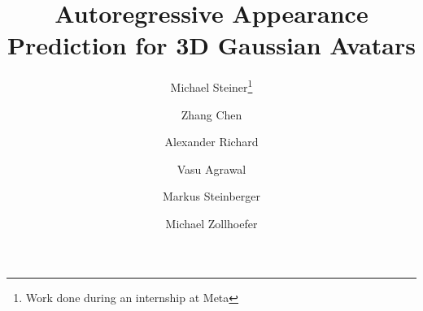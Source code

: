 \documentclass[runningheads]{llncs}
\begin{document}
\title{Autoregressive Appearance Prediction for 3D Gaussian Avatars} 



\author{Michael Steiner\thanks{Work done during an internship at Meta} \and
Zhang Chen \and
Alexander Richard \and
Vasu Agrawal \and
Markus Steinberger \and
Michael Zollhoefer
}



\maketitle
\end{document}
